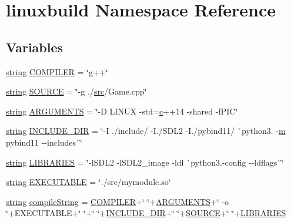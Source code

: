 \hypertarget{namespacelinuxbuild}{}\section{linuxbuild Namespace Reference}
\label{namespacelinuxbuild}
\subsection*{Variables}
\begin{DoxyCompactItemize}
\item 
\mbox{\hyperlink{asdl_8h_ae84541b4f3d8e1ea24ec0f466a8c568b}{string}} \mbox{\hyperlink{namespacelinuxbuild_a67565370a9a5bc2e652adc90570ae1d9}{C\+O\+M\+P\+I\+L\+ER}} = \char`\"{}g++\char`\"{}
\item 
\mbox{\hyperlink{asdl_8h_ae84541b4f3d8e1ea24ec0f466a8c568b}{string}} \mbox{\hyperlink{namespacelinuxbuild_a9a51ab9159bdd85160ff7debd98e8bf1}{S\+O\+U\+R\+CE}} = \char`\"{}-\/g ./\mbox{\hyperlink{_s_d_l__opengl__glext_8h_a72e0fdf0f845ded60b1fada9e9195cd7}{src}}/Game.\+cpp\char`\"{}
\item 
\mbox{\hyperlink{asdl_8h_ae84541b4f3d8e1ea24ec0f466a8c568b}{string}} \mbox{\hyperlink{namespacelinuxbuild_aad9d75071db584a9ec8eff302b0b7b60}{A\+R\+G\+U\+M\+E\+N\+TS}} = \char`\"{}-\/D L\+I\+N\+UX -\/std=\mbox{\hyperlink{_s_d_l__opengl__glext_8h_a1f2d7f8147412c43ba2303a56f97ee73}{c}}++14 -\/shared -\/f\+P\+IC\char`\"{}
\item 
\mbox{\hyperlink{asdl_8h_ae84541b4f3d8e1ea24ec0f466a8c568b}{string}} \mbox{\hyperlink{namespacelinuxbuild_a5043360151bd876c9aa7bcd6bff4dc5d}{I\+N\+C\+L\+U\+D\+E\+\_\+\+D\+IR}} = \char`\"{}-\/I ./include/ -\/I./S\+D\+L2 -\/I./pybind11/ \`{}python3. -\/\mbox{\hyperlink{_s_d_l__opengl__glext_8h_af593500c283bf1a787a6f947f503a5c2}{m}} pybind11 -\/-\/includes\`{}\char`\"{}
\item 
\mbox{\hyperlink{asdl_8h_ae84541b4f3d8e1ea24ec0f466a8c568b}{string}} \mbox{\hyperlink{namespacelinuxbuild_a8d8b6325ef25fe198a192c9b2f32a3c4}{L\+I\+B\+R\+A\+R\+I\+ES}} = \char`\"{}-\/l\+S\+D\+L2 -\/l\+S\+D\+L2\+\_\+image -\/ldl \`{}python3.-\/config -\/-\/ldflags\`{}\char`\"{}
\item 
\mbox{\hyperlink{asdl_8h_ae84541b4f3d8e1ea24ec0f466a8c568b}{string}} \mbox{\hyperlink{namespacelinuxbuild_ae5a3f16392392771c37d2119f51f2a46}{E\+X\+E\+C\+U\+T\+A\+B\+LE}} = \char`\"{}./src/mymodule.\+so\char`\"{}
\item 
\mbox{\hyperlink{asdl_8h_ae84541b4f3d8e1ea24ec0f466a8c568b}{string}} \mbox{\hyperlink{namespacelinuxbuild_abd62d69edb0813f34ae7197ae2d4a4ad}{compile\+String}} = \mbox{\hyperlink{namespacelinuxbuild_a67565370a9a5bc2e652adc90570ae1d9}{C\+O\+M\+P\+I\+L\+ER}}+\char`\"{} \char`\"{}+\mbox{\hyperlink{namespacelinuxbuild_aad9d75071db584a9ec8eff302b0b7b60}{A\+R\+G\+U\+M\+E\+N\+TS}}+\char`\"{} -\/o \char`\"{}+E\+X\+E\+C\+U\+T\+A\+B\+LE+\char`\"{} \char`\"{}+\char`\"{} \char`\"{}+\mbox{\hyperlink{namespacelinuxbuild_a5043360151bd876c9aa7bcd6bff4dc5d}{I\+N\+C\+L\+U\+D\+E\+\_\+\+D\+IR}}+\char`\"{} \char`\"{}+\mbox{\hyperlink{namespacelinuxbuild_a9a51ab9159bdd85160ff7debd98e8bf1}{S\+O\+U\+R\+CE}}+\char`\"{} \char`\"{}+\mbox{\hyperlink{namespacelinuxbuild_a8d8b6325ef25fe198a192c9b2f32a3c4}{L\+I\+B\+R\+A\+R\+I\+ES}}

\end{DoxyCompactItemize}
